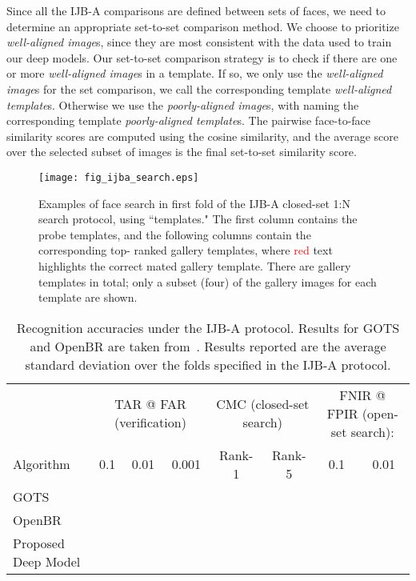 \documentclass[10pt,journal,compsoc]{IEEEtran}
\begin{document}
Since all the IJB-A comparisons are defined between sets of faces, we need to determine an appropriate set-to-set comparison method. We choose to prioritize \emph{well-aligned image}s, since they are most consistent with the data used to train our deep models. Our set-to-set comparison strategy is to check if there are one or more \emph{well-aligned image}s in a template. If so, we only use the \emph{well-aligned image}s for the set comparison, we call the corresponding template \emph{well-aligned template}s. Otherwise we use the \emph{poorly-aligned image}s, with naming the corresponding template \emph{poorly-aligned template}s. The pairwise face-to-face similarity scores are computed using the cosine similarity, and the average score over the selected subset of images is the final set-to-set similarity score.

\begin{figure*}[htbp]
    \centering
    \texttt{[image: fig\_ijba\_search.eps]}
    \vspace{-0.1in}
    \caption{Examples of face search in first fold of the IJB-A closed-set 1:N search protocol, using ``templates." The first column contains the probe templates, and the following  columns contain the corresponding top- ranked gallery templates, where \textcolor{red}{red} text highlights the correct mated gallery template. There are  gallery templates in total; only a subset (four) of the gallery images for each template are shown.}\label{fig:ijba-search}
\end{figure*}

\begin{table*}[htbp]
    \caption{Recognition accuracies under the IJB-A protocol. Results for GOTS and OpenBR are taken from~\cite{db:janus}. Results reported are the average  standard deviation over the  folds specified in the IJB-A protocol.}
    \label{tab:ijba_perf}
    \begin{tabular}{lccccccc}
        \toprule
            & \multicolumn{3}{c}{TAR @ FAR (verification)} & \multicolumn{2}{c}{CMC (closed-set search)} & \multicolumn{2}{c}{FNIR @ FPIR (open-set search):} \\
            \cmidrule(lr){2-4} \cmidrule(lr){5-6} \cmidrule(lr){7-8}
        Algorithm    & 0.1 & 0.01 & 0.001 & Rank-1 & Rank-5 & 0.1 & 0.01 \\
        \midrule
        GOTS &  &  &  &    & 
                &  &  \\
        OpenBR &  &  &  &  &  &  &  \\
        Proposed Deep Model &  &  &  &  &  &  &  \\
        \bottomrule
    \end{tabular}
\end{table*}
\end{document}
